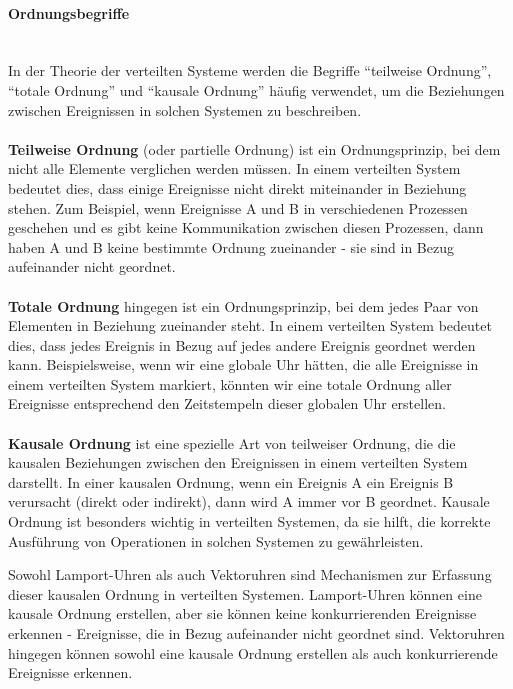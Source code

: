 \paragraph{Ordnungsbegriffe\\\\}
In der Theorie der verteilten Systeme werden die Begriffe \enquote{teilweise Ordnung}, \enquote{totale Ordnung} und \enquote{kausale Ordnung} häufig verwendet, um die Beziehungen zwischen Ereignissen in solchen Systemen zu beschreiben.
\\\\
\textbf{Teilweise Ordnung} (oder partielle Ordnung) ist ein Ordnungsprinzip, bei dem nicht alle Elemente verglichen werden müssen. In einem verteilten System bedeutet dies, dass einige Ereignisse nicht direkt miteinander in Beziehung stehen. Zum Beispiel, wenn Ereignisse A und B  in verschiedenen Prozessen geschehen und es gibt keine Kommunikation zwischen diesen Prozessen, dann haben A und B keine bestimmte Ordnung zueinander - sie sind in Bezug aufeinander nicht geordnet.
\\\\
\textbf{Totale Ordnung} hingegen ist ein Ordnungsprinzip, bei dem jedes Paar von Elementen in Beziehung zueinander steht. In einem verteilten System bedeutet dies, dass jedes Ereignis in Bezug auf jedes andere Ereignis geordnet werden kann. Beispielsweise, wenn wir eine globale Uhr hätten, die alle Ereignisse in einem verteilten System markiert, könnten wir eine totale Ordnung aller Ereignisse entsprechend den Zeitstempeln dieser globalen Uhr erstellen.
\\\\
\textbf{Kausale Ordnung} ist eine spezielle Art von teilweiser Ordnung, die die kausalen Beziehungen zwischen den Ereignissen in einem verteilten System darstellt. In einer kausalen Ordnung, wenn ein Ereignis A ein Ereignis B verursacht (direkt oder indirekt), dann wird A immer vor B geordnet. Kausale Ordnung ist besonders wichtig in verteilten Systemen, da sie hilft, die korrekte Ausführung von Operationen in solchen Systemen zu gewährleisten.

Sowohl Lamport-Uhren als auch Vektoruhren sind Mechanismen zur Erfassung dieser kausalen Ordnung in verteilten Systemen. Lamport-Uhren können eine kausale Ordnung erstellen, aber sie können keine konkurrierenden Ereignisse erkennen - Ereignisse, die in Bezug aufeinander nicht geordnet sind. Vektoruhren hingegen können sowohl eine kausale Ordnung erstellen als auch konkurrierende Ereignisse erkennen.

